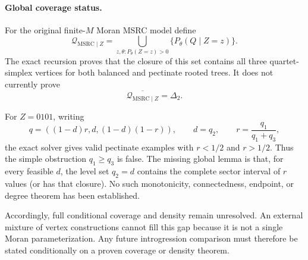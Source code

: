 \paragraph{Global coverage status.}
For the original finite-$M$ Moran MSRC model define
\[
\mathcal Q_{\mathrm{MSRC}\mid Z}
=\bigcup_{z,\theta:P_\theta(Z=z)>0}
\{P_\theta(Q\mid Z=z)\}.
\]
The exact recursion proves that the closure of this set contains all three
quartet-simplex vertices for both balanced and pectinate rooted trees. It does
not currently prove
\[
\overline{\mathcal Q_{\mathrm{MSRC}\mid Z}}=\Delta_2.
\]

For $Z=0101$, writing
\[
q=((1-d)r,d,(1-d)(1-r)),
\qquad d=q_2,
\qquad r=\frac{q_1}{q_1+q_3},
\]
the exact solver gives valid pectinate examples with $r<1/2$ and $r>1/2$.
Thus the simple obstruction $q_1\ge q_3$ is false. The missing global lemma is
that, for every feasible $d$, the level set $q_2=d$ contains the complete
sector interval of $r$ values (or has that closure). No such monotonicity,
connectedness, endpoint, or degree theorem has been established.

Accordingly, full conditional coverage and density remain unresolved. An
external mixture of vertex constructions cannot fill this gap because it is
not a single Moran parameterization. Any future introgression comparison must
therefore be stated conditionally on a proven coverage or density theorem.
